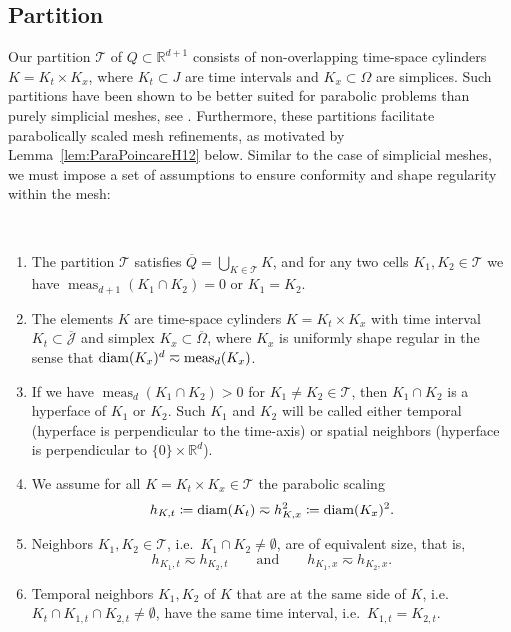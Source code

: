 \documentclass{amsart}
\providecommand{\tria}{\mathcal{T}}
\providecommand{\diam}{\textup{diam}}
\DeclareMathOperator{\meas}{meas}
\begin{document}
\subsection{Partition}\label{subsec:tria}
Our partition $\mathcal{T}$ of $Q \subset \mathbb{R}^{d+1}$ consists of non-overlapping time-space cylinders $K = K_t \times K_x$, where $K_t \subset J$ are time intervals and $K_x \subset \Omega$ are simplices. Such partitions have been shown to be better suited for parabolic problems than purely simplicial meshes, see \cite{DieningStorn22,GantnerStevenson23}. Furthermore, these partitions facilitate parabolically scaled mesh refinements, as motivated by Lemma~\ref{lem:ParaPoincareH12} below. Similar to the case of simplicial meshes, we must impose a set of assumptions to ensure conformity and shape regularity within the mesh:
%
\begin{assumption}[Partition]\label{ass:Partition} %
\ 
\begin{enumerate}
\item The partition $\tria$ satisfies $\overline{Q} = \bigcup_{K\in \tria} K$, and for any two cells $K_1,K_2\in \tria$ we have $\meas_{d+1}(K_1 \cap K_2)=0$ or $K_1 = K_2$.
\item The elements $K$ are time-space cylinders $K = K_t \times K_x$ with time interval $K_t \subset \overline{\mathcal{J}}$ and simplex $K_x \subset \overline{\Omega}$, where $K_x$ is uniformly shape regular in the sense that $\diam(K_x)^d\eqsim  \meas_{d}(K_x)$.
\item If we have $\meas_{d}(K_1 \cap K_2)>0$ for $K_1 \neq K_2 \in \tria$, then  $K_1 \cap K_2$ is a hyperface of $K_1$ or $K_2$. 
Such $K_1$ and $K_2$ will be called either temporal (hyperface is perpendicular to the time-axis) or spatial neighbors (hyperface is perpendicular to $\lbrace 0 \rbrace \times \mathbb{R}^d$). \label{itm:conformity}
\item We assume for all $K = K_t\times K_x \in \tria$ the parabolic scaling 
\begin{equation}\label{eq:ParabolicScaling}
h_{K,t} \coloneqq \diam(K_t) \eqsim h_{K,x}^2 \coloneqq \diam(K_x)^2.
\end{equation}
\item Neighbors $K_1, K_2 \in \tria$, i.e.~$K_1\cap K_2\neq \emptyset$, are of equivalent size, that is, 
\begin{equation}\label{eq:EqualSizeNeighbors}
h_{K_1,t} \eqsim h_{K_2,t}\qquad\text{and}\qquad h_{K_1,x} \eqsim h_{K_2,x}.
\end{equation}
\item Temporal neighbors $K_1,K_2$ of $K$ that are at the same side of $K$, i.e. $K_t \cap K_{1,t} \cap K_{2,t} \neq \emptyset$, have the same time interval, i.e.~$K_{1,t} = K_{2,t}$.
\label{itm:TimeSpaceCylNeighbors}
\end{enumerate}
\end{assumption}
\end{document}
